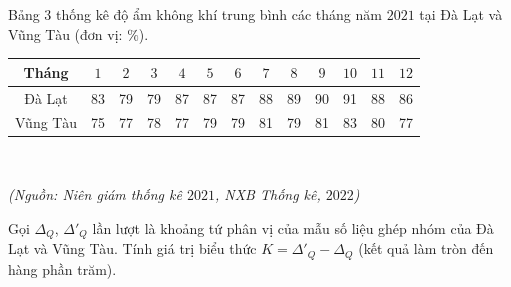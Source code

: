 \begin{ex}%
	Bảng  $3$ thống kê độ ẩm không khí trung bình các tháng năm $2021$ tại Đà Lạt và Vũng Tàu (đơn vị: $\%$). 
	\begin{center}
		\begin{tabular}{*{13}{|c}|}
			\hline
			Tháng &$1$&$2$&$3$&$4$&$5$&$6$&$7$&$8$&$9$&$10$&$11$&$12$ \\
			\hline
			Đà Lạt &83&79&79&87&87&87&88&89&90&91&88&86 \\
			\hline
			Vũng Tàu &75&77&78&77&79&79&81&79&81&83&80&77 \\
			\hline
		\end{tabular}\\
	\end{center}
	\begin{flushright}
		\textit{(Nguồn: Niên giám thống kê $2021$, NXB Thống kê, $2022$)}
	\end{flushright}
	Gọi $\Delta_Q$, $\Delta'_Q$ lần lượt là khoảng tứ phân vị của mẫu số liệu ghép nhóm của Đà Lạt và Vũng Tàu. Tính giá trị biểu thức $K=\Delta '_Q-\Delta_Q$ (kết quả làm tròn đến hàng phần trăm).
\end{ex}
